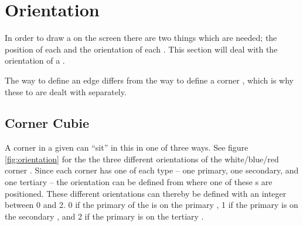 \section{Orientation}
In order to draw a \rubik{} on the screen there are two things which are needed; the position of each \cubie{} and the orientation of each \cubie{}. This section will deal with the orientation of a \cubie{}.

The way to define an edge \cubie{} differs from the way to define a corner \cubie{}, which is why these to are dealt with separately.

\subsection{Corner Cubie}
A corner \cubie{} in a given \cubicle{} can ``sit'' in this \cubicle{} in one of three ways. See figure \ref{fig:orientation} for the the three different orientations of the white/blue/red corner \cubie{}.
Since each corner \cubie{} has one of each \facelet{} type -- one primary, one secondary, and one tertiary -- the orientation can be defined from where one of these \facelet{}s are positioned.
These different orientations can thereby be defined with an integer between 0 and 2.
0 if the primary \facelet{} of the \cubie{} is on the primary \face{}, 1 if the primary \facelet{} is on the secondary \face{}, and 2 if the primary \facelet{} is on the tertiary \face{}.

